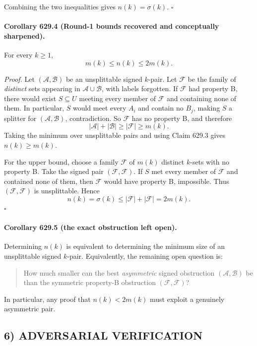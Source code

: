 Combining the two inequalities gives \(n(k)=\sigma(k)\). \(\square\)

\paragraph{Corollary 629.4 (Round-1 bounds recovered and conceptually sharpened).}
For every \(k\ge 1\),
\[
m(k)\le n(k)\le 2m(k).
\]

\emph{Proof.}
Let \((\mathcal A,\mathcal B)\) be an unsplittable signed \(k\)-pair.
Let \(\mathcal F\) be the family of \emph{distinct} sets appearing in \(\mathcal A\cup\mathcal B\), with labels forgotten.
If \(\mathcal F\) had property B, there would exist \(S\subseteq U\) meeting every member of \(\mathcal F\) and containing none of them.
In particular, \(S\) would meet every \(A_i\) and contain no \(B_j\), making \(S\) a splitter for \((\mathcal A,\mathcal B)\), contradiction.
So \(\mathcal F\) has no property B, and therefore
\[
|\mathcal A|+|\mathcal B|\ge |\mathcal F|\ge m(k).
\]
Taking the minimum over unsplittable pairs and using Claim 629.3 gives \(n(k)\ge m(k)\).

For the upper bound, choose a family \(\mathcal F\) of \(m(k)\) distinct \(k\)-sets with no property B.
Take the signed pair \((\mathcal F,\mathcal F)\).
If \(S\) met every member of \(\mathcal F\) and contained none of them, then \(\mathcal F\) would have property B, impossible.
Thus \((\mathcal F,\mathcal F)\) is unsplittable.
Hence
\[
n(k)=\sigma(k)\le |\mathcal F|+|\mathcal F|=2m(k).
\]
\(\square\)

\paragraph{Corollary 629.5 (the exact obstruction left open).}
Determining \(n(k)\) is equivalent to determining the minimum size of an unsplittable signed \(k\)-pair.
Equivalently, the remaining open question is:

\begin{quote}
How much smaller can the best \emph{asymmetric} signed obstruction \((\mathcal A,\mathcal B)\) be than the symmetric property-B obstruction \((\mathcal F,\mathcal F)\)?
\end{quote}

In particular, any proof that \(n(k)<2m(k)\) must exploit a genuinely asymmetric pair.

\subsection*{6) ADVERSARIAL VERIFICATION}

